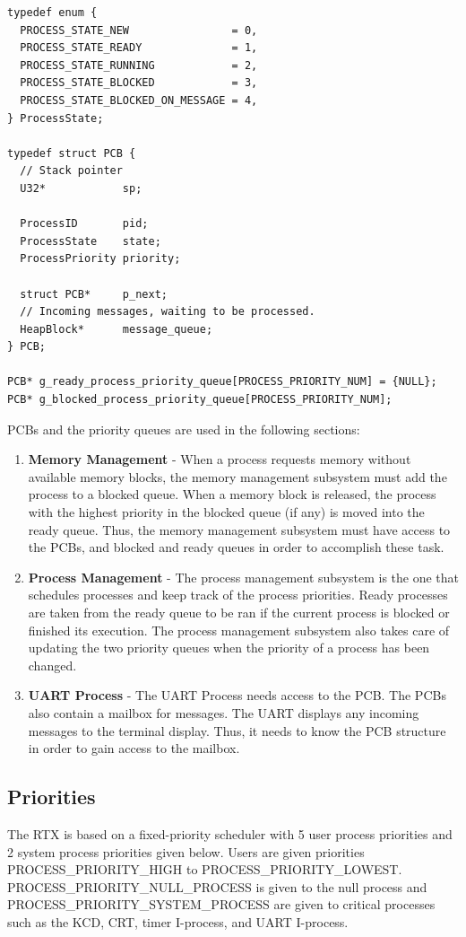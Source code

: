 \documentclass[12pt]{report}
\begin{document}
\begin{lstlisting}
typedef enum {
  PROCESS_STATE_NEW                = 0,
  PROCESS_STATE_READY              = 1,
  PROCESS_STATE_RUNNING            = 2,
  PROCESS_STATE_BLOCKED            = 3,
  PROCESS_STATE_BLOCKED_ON_MESSAGE = 4,
} ProcessState;

typedef struct PCB {
  // Stack pointer
  U32*            sp;

  ProcessID       pid;
  ProcessState    state;
  ProcessPriority priority;

  struct PCB*     p_next;
  // Incoming messages, waiting to be processed.
  HeapBlock*      message_queue;
} PCB;

PCB* g_ready_process_priority_queue[PROCESS_PRIORITY_NUM] = {NULL};
PCB* g_blocked_process_priority_queue[PROCESS_PRIORITY_NUM];
\end{lstlisting}

PCBs and the priority queues are used in the following sections:
\begin{enumerate}
    \item {\bf Memory Management} - When a process requests memory without available memory blocks, the memory management subsystem must add the process to a blocked queue. When a memory block is released, the process with the highest priority in the blocked queue (if any) is moved into the ready queue. Thus, the memory management subsystem must have access to the PCBs, and blocked and ready queues in order to accomplish these task.
    \item {\bf Process Management} - The process management subsystem is the one that schedules processes and keep track of the process priorities. Ready processes are taken from the ready queue to be ran if the current process is blocked or finished its execution. The process management subsystem also takes care of updating the two priority queues when the priority of a process has been changed.
    \item {\bf UART Process} - The UART Process needs access to the PCB. The PCBs also contain a mailbox for messages. The UART displays any incoming messages to the terminal display. Thus, it needs to know the PCB structure in order to gain access to the mailbox.
\end{enumerate}

\subsection{Priorities}
The RTX is based on a fixed-priority scheduler with 5 user process priorities and 2 system process priorities given below. Users are given priorities PROCESS\_PRIORITY\_HIGH to PROCESS\_PRIORITY\_LOWEST. PROCESS\_PRIORITY\_NULL\_PROCESS is given to the null process and PROCESS\_PRIORITY\_SYSTEM\_PROCESS are given to critical processes such as the KCD, CRT, timer I-process, and UART I-process.
\end{document}
